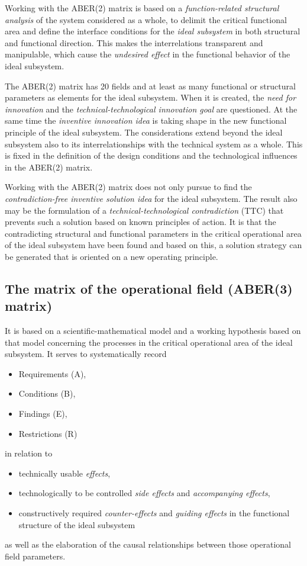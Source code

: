 \documentclass[11pt,a4paper]{article}
\begin{document}
Working with the ABER(2) matrix is based on a \emph{function-related
  structural analysis} of the system considered as a whole, to delimit the
critical functional area and define the interface conditions for the
\emph{ideal subsystem} in both structural and functional direction. This makes
the interrelations transparent and manipulable, which cause the
\emph{undesired effect} in the functional behavior of the ideal subsystem.

The ABER(2) matrix has 20 fields and at least as many functional or structural
parameters as elements for the ideal subsystem. When it is created, the
\emph{need for innovation} and the \emph{technical-technological innovation
  goal} are questioned. At the same time the \emph{inventive innovation idea}
is taking shape in the new functional principle of the ideal subsystem. The
considerations extend beyond the ideal subsystem also to its
interrelationships with the technical system as a whole. This is fixed in the
definition of the design conditions and the technological influences in the
ABER(2) matrix.

Working with the ABER(2) matrix does not only pursue to find the
\emph{contradiction-free inventive solution idea} for the ideal subsystem.
The result also may be the formulation of a \emph{technical-technological
  contradiction} (TTC) that prevents such a solution based on known principles
of action. It is that the contradicting structural and functional parameters
in the critical operational area of the ideal subsystem have been found and
based on this, a solution strategy can be generated that is oriented on a new
operating principle.

\subsection{The matrix of the operational field (ABER(3) matrix)}

It is based on a scientific-mathematical model and a working hypothesis based
on that model concerning the processes in the critical operational area of the
ideal subsystem. It serves to systematically record
\begin{itemize}
\item Requirements (A),
\item Conditions (B),
\item Findings (E),
\item Restrictions (R)
\end{itemize}
in relation to
\begin{itemize}
\item technically usable \emph{effects},
\item technologically to be controlled \emph{side effects} and
  \emph{accompanying effects},
\item constructively required \emph{counter-effects} and \emph{guiding
  effects} in the functional structure of the ideal subsystem
\end{itemize}
as well as the elaboration of the causal relationships between those
operational field parameters.
\end{document}

